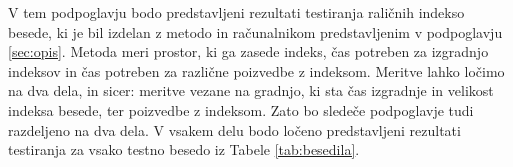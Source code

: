 %
%

V tem podpoglavju bodo predstavljeni rezultati testiranja raličnih indekso besede, ki je bil izdelan z metodo in računalnikom predstavljenim v podpoglavju \ref{sec:opis}. Metoda meri prostor, ki ga zasede indeks, čas potreben za izgradnjo indeksov in čas potreben za različne poizvedbe z indeksom. Meritve lahko ločimo na dva dela, in sicer: meritve vezane na gradnjo, ki sta čas izgradnje in velikost indeksa besede, ter poizvedbe z indeksom. Zato bo sledeče podpoglavje tudi razdeljeno na dva dela. V vsakem delu bodo ločeno predstavljeni rezultati testiranja za vsako testno besedo iz Tabele \ref{tab:besedila}.


